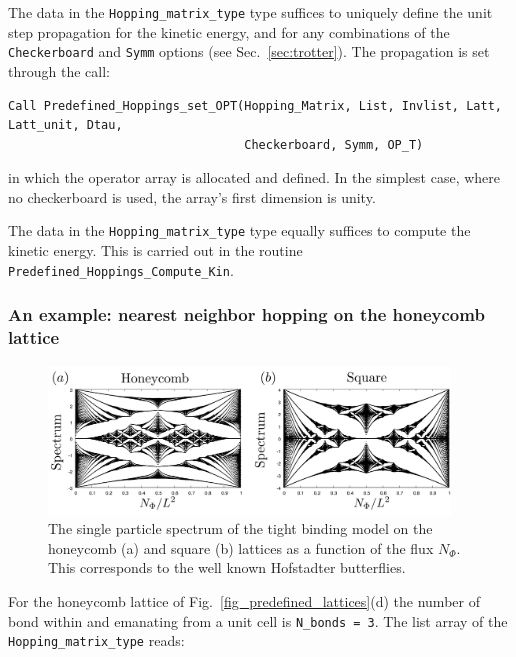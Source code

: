 The  data in the \texttt{Hopping\_matrix\_type} type suffices to uniquely define the  unit step propagation for the kinetic energy, and for  any combinations of the  \texttt{Checkerboard} and  \texttt{Symm}  options (see Sec.~\ref{sec:trotter}). The propagation is set through the call: 
\begin{lstlisting}[style=fortran]
Call Predefined_Hoppings_set_OPT(Hopping_Matrix, List, Invlist, Latt, Latt_unit, Dtau,
                                 Checkerboard, Symm, OP_T)
\end{lstlisting}
in which the operator array  is allocated and defined. In the simplest case, where no checkerboard is used, the array's first dimension is unity.


The   data in  the \texttt{Hopping\_matrix\_type} type   equally  suffices to compute  the kinetic energy.  This is carried out in the routine \texttt{Predefined\_Hoppings\_Compute\_Kin}.

\subsubsection{An example:   nearest neighbor hopping on the   honeycomb lattice }

\begin{figure}
	\begin{center}
		\includegraphics[width=0.95\textwidth,clip]{Figures/But.png}
		\caption{The single particle spectrum  of the tight binding model on the  honeycomb  (a) and square (b) lattices as a function of the  flux  $N_\Phi$.    This corresponds to the well known  Hofstadter butterflies.  }
		\label{But.fig}
	\end{center}
\end{figure}

For the honeycomb lattice of  Fig.~\ref{fig_predefined_lattices}(d)   the number of  bond within and emanating from  a unit cell is \texttt{N\_bonds = 3}.     The list array of the \texttt{Hopping\_matrix\_type} reads:

